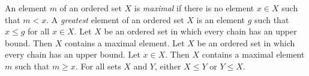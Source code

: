  An element $m$ of an ordered set $X$ is \textit{maximal} if there is no element $x \in X$ such that $m < x$.
 A \textit{greatest} element of an ordered set $X$ is an element $g$ such that $x \leq g$ for all $x \in X$.
 Let $X$ be an ordered set in which every chain has an upper bound. Then $X$ contains a maximal element.
 Let $X$ be an ordered set in which every chain has an upper bound. Let $x \in X$. Then $X$ contains a maximal element $m$ such that $m \geq x$.
 For all sets $X$ and $Y$, either $X \leq Y$ or $Y \leq X$.
